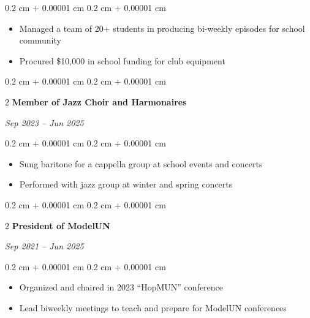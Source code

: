 \documentclass[10pt, letterpaper]{article}
\newenvironment{highlights}{
    \begin{itemize}[
        topsep=0.10 cm,
        parsep=0.10 cm,
        partopsep=0pt,
        itemsep=0pt,
        leftmargin=0.4 cm + 10pt
    ]
}{
    \end{itemize}
} %
\newenvironment{onecolentry}{
    \begin{adjustwidth}{
        0.2 cm + 0.00001 cm
    }{
        0.2 cm + 0.00001 cm
    }
}{
    \end{adjustwidth}
} %
\newenvironment{twocolentry}[2][]{
    \onecolentry
    \def\secondColumn{#2}
    \setcolumnwidth{\fill, 4.5 cm}
    \begin{paracol}{2}
}{
    \switchcolumn \raggedleft \secondColumn
    \end{paracol}
    \endonecolentry
} %
\begin{document}
    \begin{onecolentry}
        \begin{highlights}
            \item Managed a team of 20+ students in producing bi-weekly episodes for school community
            \item Procured \$10,000 in school funding for club equipment
        \end{highlights}
    \end{onecolentry}
    
    \vspace{0.2 cm}
    
    \begin{twocolentry}{\textit{Sep 2023 – Jun 2025 }}{\textbf{Member of Jazz Choir and Harmonaires}}
    \end{twocolentry}
    
    \vspace{0.10 cm}
    
    \begin{onecolentry}
        \begin{highlights}
            \item Sung baritone for a cappella group at school events and concerts  
            \item Performed with jazz group at winter and spring concerts
        \end{highlights}
    \end{onecolentry}
    
    \vspace{0.2 cm}
    
    \begin{twocolentry}{\textit{Sep 2021 – Jun 2025 }}{\textbf{President of ModelUN}}
    \end{twocolentry}
    
    \vspace{0.10 cm}
    
    \begin{onecolentry}
        \begin{highlights}
            \item Organized and chaired in 2023 “HopMUN” conference
            \item Lead biweekly meetings to teach and prepare for ModelUN conferences
        \end{highlights}
    \end{onecolentry}
    
    \vspace{0.2 cm}
    
\end{document}
